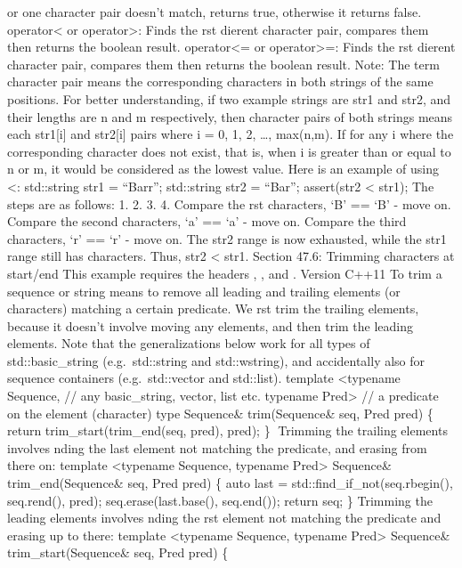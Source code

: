 or one character pair doesn't match, returns true, otherwise it returns
false. operator\textless{} or operator\textgreater: Finds the rst
dierent character pair, compares them then returns the boolean result.
operator\textless= or operator\textgreater=: Finds the rst dierent
character pair, compares them then returns the boolean result. Note: The
term character pair means the corresponding characters in both strings
of the same positions. For better understanding, if two example strings
are str1 and str2, and their lengths are n and m respectively, then
character pairs of both strings means each str1{[}i{]} and str2{[}i{]}
pairs where i = 0, 1, 2, \ldots, max(n,m). If for any i where the
corresponding character does not exist, that is, when i is greater than
or equal to n or m, it would be considered as the lowest value. Here is
an example of using \textless: std::string str1 = ``Barr''; std::string
str2 = ``Bar''; assert(str2 \textless{} str1); The steps are as follows:
1. 2. 3. 4. Compare the rst characters, `B' == `B' - move on. Compare
the second characters, `a' == `a' - move on. Compare the third
characters, `r' == `r' - move on. The str2 range is now exhausted, while
the str1 range still has characters. Thus, str2 \textless{} str1.
Section 47.6: Trimming characters at start/end This example requires the
headers , , and . Version C++11 To trim a sequence or string means to
remove all leading and trailing elements (or characters) matching a
certain predicate. We rst trim the trailing elements, because it doesn't
involve moving any elements, and then trim the leading elements. Note
that the generalizations below work for all types of std::basic\_string
(e.g.~std::string and std::wstring), and accidentally also for sequence
containers (e.g.~std::vector and std::list). template \textless typename
Sequence, // any basic\_string, vector, list etc. typename
Pred\textgreater{} // a predicate on the element (character) type
Sequence\& trim(Sequence\& seq, Pred pred) \{ return
trim\_start(trim\_end(seq, pred), pred); \} Trimming the trailing
elements involves nding the last element not matching the predicate, and
erasing from there on: template \textless typename Sequence, typename
Pred\textgreater{} Sequence\& trim\_end(Sequence\& seq, Pred pred) \{
auto last = std::find\_if\_not(seq.rbegin(), seq.rend(), pred);
seq.erase(last.base(), seq.end()); return seq; \} Trimming the leading
elements involves nding the rst element not matching the predicate and
erasing up to there: template \textless typename Sequence, typename
Pred\textgreater{} Sequence\& trim\_start(Sequence\& seq, Pred pred) \{
